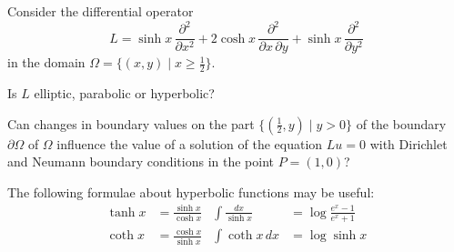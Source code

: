 Consider the differential operator 
\begin{equation}
L
=
\sinh x\,\frac{\partial^2}{\partial x^2}
+
2\cosh x\,\frac{\partial^2}{\partial x\,\partial y}
+
\sinh x\,\frac{\partial^2}{\partial y^2}
\label{90000024:eqn}
\end{equation}
in the domain $\Omega=\{(x,y)\mid x\ge \frac12\}$.
\begin{teilaufgaben}
\item
Is $L$ elliptic, parabolic or hyperbolic?
\item
Can changes in boundary values on the part $\{(\frac12,y)\mid y>0\}$ 
of the boundary $\partial\Omega$ of $\Omega$ influence the value
of a solution of the equation $Lu=0$ with Dirichlet and Neumann
boundary conditions in the point $P=(1,0)$?
\end{teilaufgaben}

\begin{hinweis}
The following formulae about hyperbolic functions may be useful:
\begin{align*}
\tanh x &= \frac{\sinh x}{\cosh x}
&
\int\frac{dx}{\sinh x} &=
\log\frac{e^x-1}{e^x+1}
\\
\coth x &= \frac{\cosh x}{\sinh x}
&\int\coth x\,dx &= \log \sinh x
\end{align*}
\end{hinweis}



